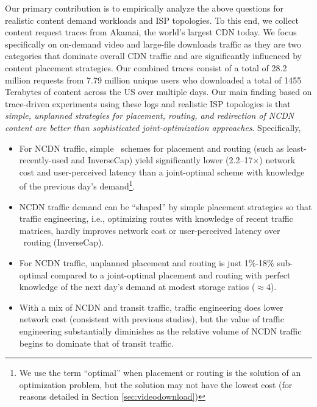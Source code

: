 Our primary contribution is to empirically analyze the above questions for realistic content demand workloads and ISP topologies. To this end, we collect content request traces from Akamai, the world's largest CDN today. We focus specifically on on-demand video and large-file downloads traffic as they are two categories that dominate overall CDN traffic and are significantly influenced by content placement strategies. Our combined traces consist of a total of 28.2  million requests from 7.79 million unique users who downloaded a total of 1455 Terabytes of content across the US over multiple days. Our main finding based on trace-driven experiments using these logs and realistic ISP topologies is that {\em simple, unplanned strategies for placement, routing, and redirection of NCDN content are better than sophisticated joint-optimization approaches}. Specifically,
\begin{itemize}
\item For NCDN traffic, simple \unplanned\ schemes for placement and routing (such as least-recently-used and InverseCap)  yield significantly lower (2.2--17$\times$) network cost and user-perceived latency than a joint-optimal scheme with knowledge of the previous day's demand\footnote{We use the term ``optimal'' when placement or routing is the solution of an optimization problem, but the solution may not have the lowest cost (for reasons detailed in Section \ref{sec:videodownload})}. 
\item NCDN traffic demand can be ``shaped'' by simple placement strategies so that  traffic engineering, i.e., optimizing routes with knowledge of recent traffic matrices, hardly improves network cost or user-perceived latency over \unplanned\ routing (InverseCap).
\item For NCDN traffic, unplanned placement and routing is just 1\%-18\% sub-optimal compared to a joint-optimal placement and routing with perfect knowledge of the next day's demand at modest storage ratios ($\approx4$). %
\item With a mix of NCDN and transit traffic, traffic engineering does lower network cost (consistent with previous studies), but the value of traffic engineering substantially diminishes as the relative volume of NCDN traffic begins to dominate that of transit traffic.
\end{itemize}
\vspace{-0.08in}

